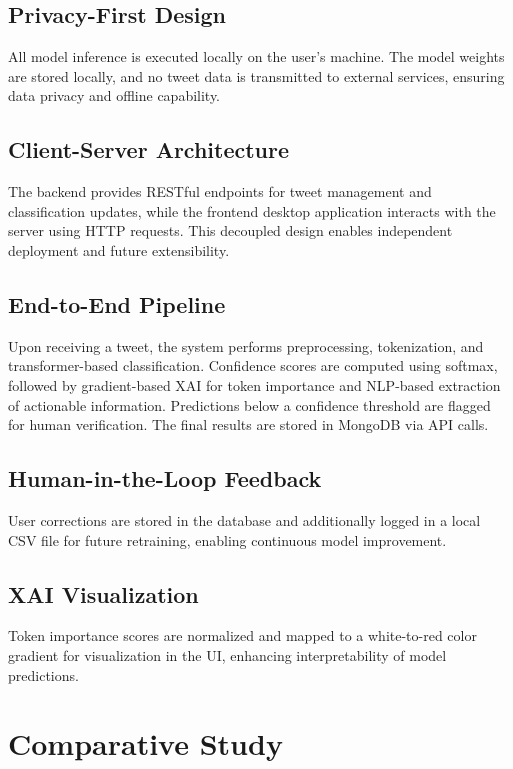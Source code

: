 \documentclass[pdflatex,sn-mathphys-num]{sn-jnl}%
\theoremstyle{thmstyleone}%
\theoremstyle{thmstyletwo}%
\theoremstyle{thmstylethree}%
\begin{document}
\subsection{Privacy-First Design}

All model inference is executed locally on the user's machine. The model weights are stored locally, and no tweet data is transmitted to external services, ensuring data privacy and offline capability.

\subsection{Client-Server Architecture}

The backend provides RESTful endpoints for tweet management and classification updates, while the frontend desktop application interacts with the server using HTTP requests. This decoupled design enables independent deployment and future extensibility.

\subsection{End-to-End Pipeline}

Upon receiving a tweet, the system performs preprocessing, tokenization, and transformer-based classification. Confidence scores are computed using softmax, followed by gradient-based XAI for token importance and NLP-based extraction of actionable information. Predictions below a confidence threshold are flagged for human verification. The final results are stored in MongoDB via API calls.

\subsection{Human-in-the-Loop Feedback}

User corrections are stored in the database and additionally logged in a local CSV file for future retraining, enabling continuous model improvement.

\subsection{XAI Visualization}

Token importance scores are normalized and mapped to a white-to-red color gradient for visualization in the UI, enhancing interpretability of model predictions.


\section{Comparative Study}
\end{document}
